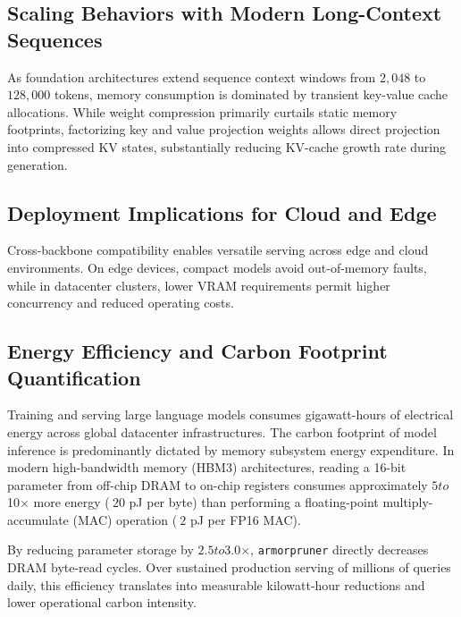 \subsection{Scaling Behaviors with Modern Long-Context Sequences}
As foundation architectures extend sequence context windows from $2{,}048$ to $128{,}000$ tokens, memory consumption is dominated by transient key-value cache allocations. While weight compression primarily curtails static memory footprints, factorizing key and value projection weights allows direct projection into compressed KV states, substantially reducing KV-cache growth rate during generation.

\subsection{Deployment Implications for Cloud and Edge}
Cross-backbone compatibility enables versatile serving across edge and cloud environments. On edge devices, compact models avoid out-of-memory faults, while in datacenter clusters, lower VRAM requirements permit higher concurrency and reduced operating costs.

\subsection{Energy Efficiency and Carbon Footprint Quantification}
Training and serving large language models consumes gigawatt-hours of electrical energy across global datacenter infrastructures. The carbon footprint of model inference is predominantly dictated by memory subsystem energy expenditure. In modern high-bandwidth memory (HBM3) architectures, reading a 16-bit parameter from off-chip DRAM to on-chip registers consumes approximately $5$\times$ to $10$\times$ more energy ($~20$ pJ per byte) than performing a floating-point multiply-accumulate (MAC) operation ($~2$ pJ per FP16 MAC).

By reducing parameter storage by $2.5$\times$ to $3.0$\times$, \texttt{armorpruner} directly decreases DRAM byte-read cycles. Over sustained production serving of millions of queries daily, this efficiency translates into measurable kilowatt-hour reductions and lower operational carbon intensity.
